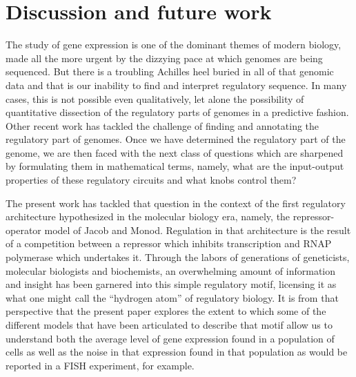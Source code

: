 \section{Discussion and future work}

The study of gene expression is one of the dominant themes of modern
biology, made all the more urgent by the dizzying pace at which
genomes are being sequenced.  But there is a troubling Achilles heel
buried in all of that genomic data and that is our inability to find
and interpret regulatory sequence.  In many cases, this is not
possible even qualitatively, let alone the possibility of quantitative
dissection of the regulatory parts of genomes in a predictive fashion.
Other recent work has tackled the challenge of finding and
annotating the regulatory part of genomes.  Once we have determined
the regulatory part of the genome, we are then faced with the
next class of questions which are sharpened by formulating
them in mathematical terms, namely, what are the input-output
properties of these regulatory circuits and what knobs control them?

The present work has tackled that question in the context of
the first regulatory architecture hypothesized in the molecular
biology era, namely, the repressor-operator model of Jacob and
Monod.  Regulation in that architecture is the result of a 
competition between a repressor which inhibits transcription
and RNAP polymerase which undertakes it.  Through
the labors of generations of geneticists, molecular biologists
and biochemists, an overwhelming amount of information
and insight has been garnered into this simple regulatory
motif, licensing it as what one might call the ``hydrogen atom''
of regulatory biology.   It is from that perspective that the present
paper explores the extent to which some of the different models
that have been articulated to describe that motif allow
us to understand both the average level of gene expression
found in a population of cells as well as the noise in that
expression found in that population as would be reported in
a FISH experiment, for example.

